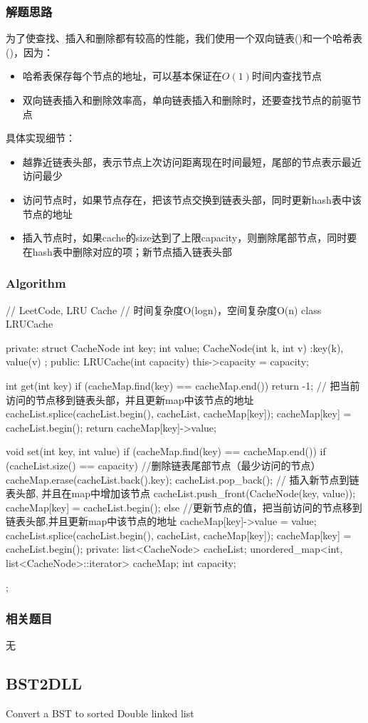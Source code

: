\subsubsection{解题思路}
为了使查找、插入和删除都有较高的性能，我们使用一个双向链表()和一个哈希表()，因为：
\begin{itemize}
	\item{哈希表保存每个节点的地址，可以基本保证在$O(1)$时间内查找节点}
	\item{双向链表插入和删除效率高，单向链表插入和删除时，还要查找节点的前驱节点}
\end{itemize}

具体实现细节：
\begin{itemize}
	\item{越靠近链表头部，表示节点上次访问距离现在时间最短，尾部的节点表示最近访问最少}
	\item{访问节点时，如果节点存在，把该节点交换到链表头部，同时更新hash表中该节点的地址}
	\item{插入节点时，如果cache的size达到了上限capacity，则删除尾部节点，同时要在hash表中删除对应的项；新节点插入链表头部}
	              
\end{itemize}


\subsubsection{Algorithm}
\begin{Code}
	// LeetCode, LRU Cache
	// 时间复杂度O(logn)，空间复杂度O(n)
	class LRUCache{
	private:
		struct CacheNode {
			int key;
			int value;
			CacheNode(int k, int v) :key(k), value(v){}
		};
	public:
		LRUCache(int capacity) {
			this->capacity = capacity;
		}
		
		int get(int key) {
			if (cacheMap.find(key) == cacheMap.end()) return -1;
			// 把当前访问的节点移到链表头部，并且更新map中该节点的地址
			cacheList.splice(cacheList.begin(), cacheList, cacheMap[key]); 
			cacheMap[key] = cacheList.begin();
			return cacheMap[key]->value;
		}
		
		void set(int key, int value) {
			if (cacheMap.find(key) == cacheMap.end()) {
				if (cacheList.size() == capacity) { //删除链表尾部节点（最少访问的节点）
					cacheMap.erase(cacheList.back().key);
					cacheList.pop_back();
				}
				// 插入新节点到链表头部, 并且在map中增加该节点
				cacheList.push_front(CacheNode(key, value));
				cacheMap[key] = cacheList.begin();
			} else {//更新节点的值，把当前访问的节点移到链表头部,并且更新map中该节点的地址
				cacheMap[key]->value = value;
				cacheList.splice(cacheList.begin(), cacheList, cacheMap[key]);
				cacheMap[key] = cacheList.begin();
			}
		}
	private:
		list<CacheNode> cacheList;
		unordered_map<int, list<CacheNode>::iterator> cacheMap;
		int capacity;
	};
\end{Code}


\subsubsection{相关题目}
\begindot
\item 无
\myenddot

\subsection{BST2DLL}
Convert a BST to sorted Double linked list

